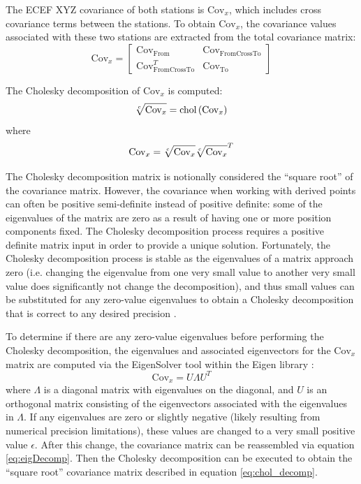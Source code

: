 The ECEF XYZ covariance of both stations is $\text{Cov}_x$, which includes cross covariance terms between the stations. To obtain $\text{Cov}_x$, the covariance values associated with these two stations are extracted from the total covariance matrix:
\begin{equation}
\text{Cov}_x = \left[ \begin{array}{cc} 
\text{Cov}_{\text{From}} & \text{Cov}_{\text{FromCrossTo}} \\ \text{Cov}_{\text{FromCrossTo}}^T & \text{Cov}_{\text{To}}
\end{array} \right]
\end{equation}



The Cholesky decomposition \cite{golub1996matrix} of $\text{Cov}_x$ is computed:
\begin{equation}
\sqrt[c]{\text{Cov}_x} = \text{chol}\left( \text{Cov}_x \right)
\end{equation}
where
\begin{equation} \label{eq:chol_decomp}
\text{Cov}_x = \sqrt[c]{\text{Cov}_x} \sqrt[c]{\text{Cov}_x}^T
\end{equation}

The Cholesky decomposition matrix is notionally considered the ``square root'' of the covariance matrix.  However, the covariance when working with derived points can often be positive semi-definite instead of positive definite: some of the eigenvalues of the matrix are zero as a result of having one or more position components fixed.  The Cholesky decomposition process requires a positive definite matrix input in order to provide a unique solution. Fortunately, the Cholesky decomposition process is stable as the eigenvalues of a matrix approach zero (i.e. changing the eigenvalue from one very small value to another very small value does significantly not change the decomposition), and thus small values can be substituted for any zero-value eigenvalues to obtain a Cholesky decomposition that is correct to any desired precision \cite{wiki:Cholesky,fang2008modified}.

To determine if there are any zero-value eigenvalues before performing the Cholesky decomposition, the eigenvalues and associated eigenvectors for the $\text{Cov}_x$ matrix are computed via the EigenSolver tool within the Eigen library \cite{EigenSolver}:
\begin{equation} \label{eq:eigDecomp}
\text{Cov}_x = U \Lambda U^T
\end{equation}
where $\Lambda$ is a diagonal matrix with eigenvalues on the diagonal, and $U$ is an orthogonal matrix consisting of the eigenvectors associated with the eigenvalues in $\Lambda$.  If any eigenvalues are zero or slightly negative (likely resulting from numerical precision limitations), these values are changed to a very small positive value $\epsilon$.  After this change, the covariance matrix can be reassembled via equation \ref{eq:eigDecomp}.  Then the Cholesky decomposition can be executed to obtain the ``square root'' covariance matrix described in equation \ref{eq:chol_decomp}.  

